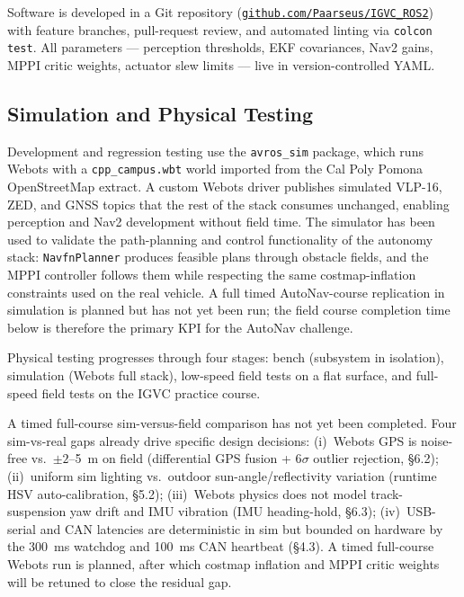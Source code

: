 \documentclass[12pt, letterpaper]{article}
\begin{document}
Software is developed in a Git repository (\href{https://github.com/Paarseus/IGVC_ROS2}
{\texttt{github.com/Paarseus/IGVC\_ROS2}}) with feature branches, pull-request review,
and automated linting via \texttt{colcon test}. All parameters --- perception thresholds,
EKF covariances, Nav2 gains, MPPI critic weights, actuator slew limits --- live in
version-controlled YAML.

\subsection{Simulation and Physical Testing}

Development and regression testing use the \texttt{avros\_sim} package, which runs Webots
with a \texttt{cpp\_campus.wbt} world imported from the Cal Poly Pomona OpenStreetMap
extract. A custom Webots driver publishes simulated VLP-16, ZED, and GNSS topics that
the rest of the stack consumes unchanged, enabling perception and Nav2 development
without field time. The simulator has been used to validate the path-planning and
control functionality of the autonomy stack: \texttt{NavfnPlanner} produces feasible
plans through obstacle fields, and the MPPI controller follows them while respecting
the same costmap-inflation constraints used on the real vehicle. A full timed
AutoNav-course replication in simulation is planned but has not yet been run; the
field course completion time below is therefore the primary KPI for the AutoNav
challenge.

Physical testing progresses through four stages: bench (subsystem in isolation),
simulation (Webots full stack), low-speed field tests on a flat surface, and full-speed
field tests on the IGVC practice course.

A timed full-course sim-versus-field comparison has not yet been completed. Four
sim-vs-real gaps already drive specific design decisions: (i)~Webots GPS is
noise-free vs.\ $\pm 2$--5~m on field (differential GPS fusion + 6$\sigma$ outlier
rejection, \S6.2); (ii)~uniform sim lighting vs.\ outdoor sun-angle/reflectivity
variation (runtime HSV auto-calibration, \S5.2); (iii)~Webots physics does not model
track-suspension yaw drift and IMU vibration (IMU heading-hold, \S6.3); (iv)~USB-serial
and CAN latencies are deterministic in sim but bounded on hardware by the 300~ms
watchdog and 100~ms CAN heartbeat (\S4.3). A timed full-course Webots run is planned,
after which costmap inflation and MPPI critic weights will be retuned to close the
residual gap.

\end{document}
